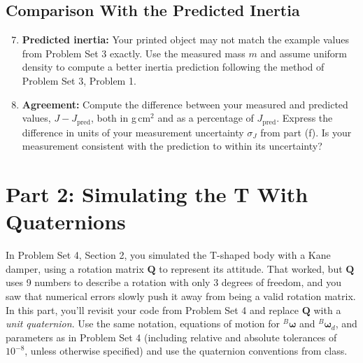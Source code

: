 \documentclass[11pt,letterpaper]{article}
\newcommand{\Bw}{{}^{B}\boldsymbol{\omega}}
\newcommand{\Bwd}{{}^{B}\boldsymbol{\omega}_d}
\newcommand{\bQ}{\mathbf{Q}}
\begin{document}
\subsection*{Comparison With the Predicted Inertia}

\begin{enumerate}[label=(\alph*)]
\setcounter{enumi}{6}
    \item \textbf{Predicted inertia:} Your printed object may not match the example values from Problem Set 3 exactly. Use the measured mass $m$ and assume uniform density to compute a better inertia prediction following the method of Problem Set 3, Problem 1.

    \item \textbf{Agreement:} Compute the difference between your measured and predicted values, $J - J_{\text{pred}}$, both in g\,cm$^2$ and as a percentage of $J_{\text{pred}}$. Express the difference in units of your measurement uncertainty $\sigma_J$ from part (f). Is your measurement consistent with the prediction to within its uncertainty?

\end{enumerate}


\section*{Part 2: Simulating the T With Quaternions}

In Problem Set 4, Section 2, you simulated the T-shaped body with a Kane damper, using a rotation matrix $\bQ$ to represent its attitude. That worked, but $\bQ$ uses 9 numbers to describe a rotation with only 3 degrees of freedom, and you saw that numerical errors slowly push it away from being a valid rotation matrix. In this part, you'll revisit your code from Problem Set 4 and replace $\bQ$ with a \emph{unit quaternion}. Use the same notation, equations of motion for $\Bw$ and $\Bwd$, and parameters as in Problem Set 4 (including relative and absolute tolerances of $10^{-8}$, unless otherwise specified) and use the quaternion conventions from class.
\end{document}
